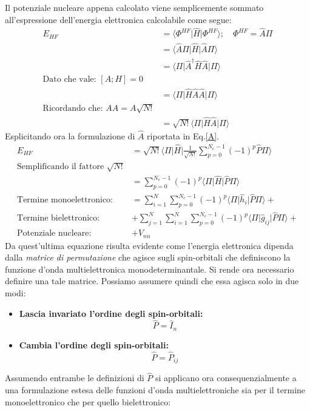 \documentclass[oneside]{amsbook}
\numberwithin{section}{chapter}
\numberwithin{equation}{section}
\numberwithin{figure}{section}
\begin{document}
Il potenziale nucleare appena calcolato viene semplicemente sommato all'espressione dell'energia elettronica calcolabile come segue:
\begin{equation}
\begin{aligned}
E_{HF}&=\langle\Phi^{HF}\vert\hat{H}\vert\Phi^{HF}\rangle; \quad \Phi^{HF}=\hat{A}\Pi\\
&=\langle\hat{A}\Pi\vert\hat{H}\vert\hat{A}\Pi\rangle\\
&= \langle\Pi\vert\hat{A}^\dagger\hat{H}\hat{A}\vert\Pi\rangle \\
\text{Dato che vale: }[A;H]=0 \\
&= \langle\Pi\vert\hat{H}\hat{A}\hat{A}\vert\Pi\rangle\\
\text{Ricordando che: } AA=A\sqrt{N!} \\
&= \sqrt{N!}\langle\Pi\vert\hat{H}\hat{A}\vert\Pi\rangle
\end{aligned}
\end{equation}
Esplicitando ora la formulazione di $\hat{A}$ riportata in Eq.\ref{A}.
\begin{equation}
\begin{aligned}
E_{HF}&= \sqrt{N!}\langle\Pi\vert\hat{H}\vert\frac{1}{\sqrt{N!}}\sum \limits_{p=0} ^{N_e-1} (-1)^p \hat{P}\Pi\rangle \\
\text{Semplificando il fattore } \sqrt{N!} \\
&= \sum \limits_{p=0} ^{N_e-1} (-1)^p \langle \Pi\vert\hat{H}\vert\hat{P}\Pi\rangle \\
\text{Termine monoelettronico:} &= \sum \limits_{i=1} ^{N} \sum \limits_{p=0} ^{N_e-1} (-1)^p \langle \Pi\vert\hat{h}_i\vert\hat{P}\Pi\rangle + \\ \text{Termine bielettronico:} &+ \sum \limits_{j=1} ^{N} \sum \limits_{i=1} ^{N} \sum \limits_{p=0} ^{N_e-1} (-1)^p  \langle \Pi\vert\hat{g}_{ij}\vert\hat{P}\Pi\rangle + \\ \text{Potenziale nucleare:} &+V_{nn}
\end{aligned}
\end{equation}
Da quest'ultima equazione risulta evidente come l'energia elettronica dipenda dalla \emph{matrice di permutazione} che agisce sugli spin-orbitali che definiscono la funzione d'onda multielettronica monodeterminantale.
Si rende ora necessario definire una tale matrice. Possiamo assumere quindi che essa agisca solo in due modi:
\begin{itemize}
\item \textbf{Lascia invariato l'ordine degli spin-orbitali:}  $$\hat{P}=\hat{I}_n $$
\item \textbf{Cambia l'ordine degli spin-orbitali:}  $$\hat{P}=\hat{P}_{ij} $$
\end{itemize} 
Assumendo entrambe le definizioni di $\hat{P}$ si applicano ora consequenzialmente a una formulazione estesa delle funzioni d'onda multielettroniche sia per il termine monoelettronico che per quello bielettronico:\\
\end{document}

